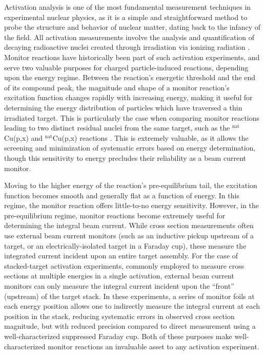 Activation analysis is one of the most fundamental measurement techniques in experimental nuclear physics, as it is a simple and straightforward method to probe the structure and behavior of nuclear matter,  dating back to the infancy of the field. 
All activation measurements involve the analysis and quantification of decaying radioactive nuclei created through irradiation via ionizing radiation \cite{ehmann1993radiochemistry,krüger1971principles}.
Monitor reactions have  historically been part of such activation experiments, and serve two valuable purposes for charged particle-induced reactions, depending upon the energy regime.  
Between the reaction's energetic threshold  and the end of its compound peak, the magnitude and shape of a monitor reaction's excitation function changes rapidly with increasing energy, making it useful for determining the energy distribution of particles which have traversed a thin irradiated target.
This is particularly the case when comparing  monitor reactions leading to two distinct residual nuclei from the same target, such as the $^\text{nat}$Cu(p,x) and $^\text{nat}$Cu(p,x) reactions \cite{gul2001charged}.
This is extremely valuable, as it allows the screening and minimization of systematic errors based on energy determination, though this sensitivity to energy precludes their reliability as a beam current monitor.  

Moving to the higher energy  of the reaction's pre-equilibrium tail, the excitation function becomes  smooth and generally flat as a function of energy.
In this regime, the monitor reaction offers little-to-no energy sensitivity. 
However,  in the pre-equilibrium regime, monitor reactions become extremely useful for determining the integral beam current. 
While cross section measurements often use external beam current monitors (such as an inductive pickup upstream of a target, or an electrically-isolated target in a Faraday cup), these measure the integrated current incident upon an entire target assembly.
For the case of stacked-target activation experiments, commonly employed to measure cross sections at multiple energies  in a single activation, external beam current monitors can only measure the integral current incident upon the \enquote{front} (upstream) of the target stack.
In these experiments, a series of monitor foils at each energy position allows one to indirectly measure the integral current at each position in the stack, reducing systematic errors in observed cross section magnitude, but with reduced precision compared to direct measurement using a well-characterized suppressed Faraday cup.
Both of these purposes make well-characterized monitor reactions an invaluable asset to any activation experiment. 



